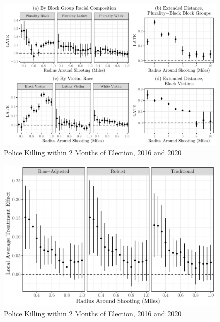 \documentclass[
  12pt,
]{article}
\begin{document}
\begin{figure}[h]

{\centering \includegraphics{shoot_to_files/figure-latex/paneled-race-effects-1} 

}

\caption{\label{fig:map}Police Killing within 2 Months of Election, 2016 and 2020}\label{fig:paneled-race-effects}
\end{figure}

\begin{figure}[h]

{\centering \includegraphics{shoot_to_files/figure-latex/first-difference-1} 

}

\caption{\label{fig:map}Police Killing within 2 Months of Election, 2016 and 2020}\label{fig:first-difference}
\end{figure}
\end{document}
